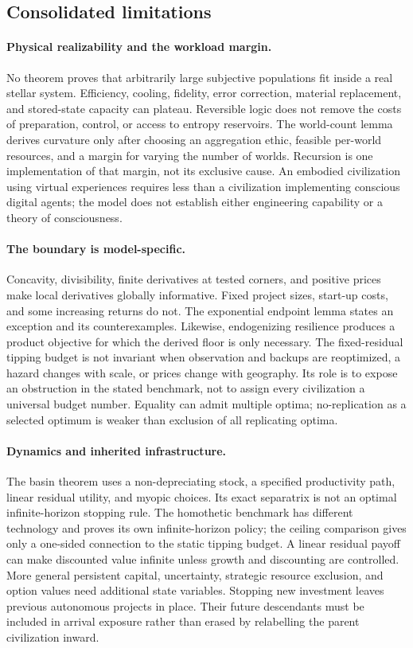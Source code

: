 \documentclass[11pt,a4paper]{article}
\theoremstyle{definition}\newtheorem{definition}{Definition}
\begin{document}
\subsection{Consolidated limitations}
\label{sec:limitations}
\paragraph{Physical realizability and the workload margin.}
No theorem proves that arbitrarily large subjective populations fit inside
a real stellar system. Efficiency, cooling, fidelity, error correction,
material replacement, and stored-state capacity can plateau. Reversible
logic does not remove the costs of preparation, control, or access to
entropy reservoirs. The world-count lemma derives curvature only after
choosing an aggregation ethic, feasible per-world resources, and a margin
for varying the number of worlds. Recursion is one implementation of that
margin, not its exclusive cause. An embodied civilization using virtual
experiences requires less than a civilization implementing conscious
digital agents; the model does not establish either engineering capability
or a theory of consciousness.

\paragraph{The boundary is model-specific.}
Concavity, divisibility, finite derivatives at tested corners, and positive
prices make local derivatives globally informative. Fixed project sizes,
start-up costs, and some increasing returns do not. The exponential
endpoint lemma states an exception and its counterexamples. Likewise,
endogenizing resilience produces a product objective for which the derived
floor is only necessary. The fixed-residual tipping budget is not invariant
when observation and backups are reoptimized, a hazard changes with scale,
or prices change with geography. Its role is to expose an obstruction in
the stated benchmark, not to assign every civilization a universal budget
number. Equality can admit multiple optima; no-replication as a selected
optimum is weaker than exclusion of all replicating optima.

\paragraph{Dynamics and inherited infrastructure.}
The basin theorem uses a non-depreciating stock, a specified productivity
path, linear residual utility, and myopic choices. Its exact separatrix is
not an optimal infinite-horizon stopping rule. The homothetic benchmark
has different technology and proves its own infinite-horizon policy;
the ceiling comparison gives only a one-sided connection to the static
tipping budget. A linear residual payoff can make discounted value
infinite unless growth and discounting are controlled. More general
persistent capital, uncertainty, strategic resource exclusion, and
option values need additional state variables. Stopping new investment
leaves previous autonomous projects in place. Their future descendants
must be included in arrival exposure rather than erased by relabelling
the parent civilization inward.
\end{document}
